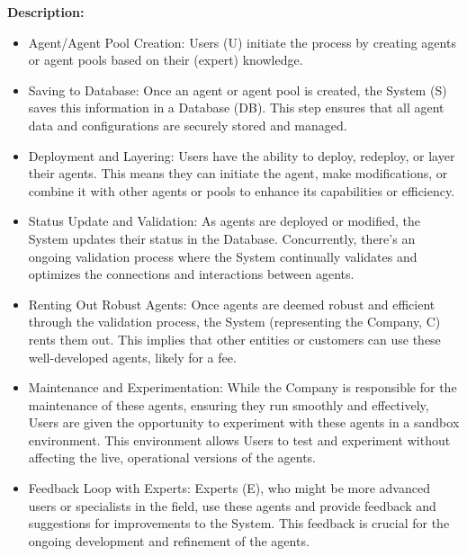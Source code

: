 \documentclass[11pt, a4paper]{article}
\begin{document}
\begin{gitbox}
        \textbf{Description:}
        \begin{itemize}
            \item Agent/Agent Pool Creation: Users (U) initiate the process by creating agents or agent pools based on their (expert) knowledge.
            \item Saving to Database: Once an agent or agent pool is created, the System (S) saves this information in a Database (DB). This step ensures that all agent data and configurations are securely stored and managed.
            \item Deployment and Layering: Users have the ability to deploy, redeploy, or layer their agents. This means they can initiate the agent, make modifications, or combine it with other agents or pools to enhance its capabilities or efficiency.
            \item Status Update and Validation: As agents are deployed or modified, the System updates their status in the Database. Concurrently, there's an ongoing validation process where the System continually validates and optimizes the connections and interactions between agents.
            \item Renting Out Robust Agents: Once agents are deemed robust and efficient through the validation process, the System (representing the Company, C) rents them out. This implies that other entities or customers can use these well-developed agents, likely for a fee.
            \item Maintenance and Experimentation: While the Company is responsible for the maintenance of these agents, ensuring they run smoothly and effectively, Users are given the opportunity to experiment with these agents in a sandbox environment. This environment allows Users to test and experiment without affecting the live, operational versions of the agents.
            \item Feedback Loop with Experts: Experts (E), who might be more advanced users or specialists in the field, use these agents and provide feedback and suggestions for improvements to the System. This feedback is crucial for the ongoing development and refinement of the agents.
        \end{itemize}
    \end{gitbox}
\end{document}
